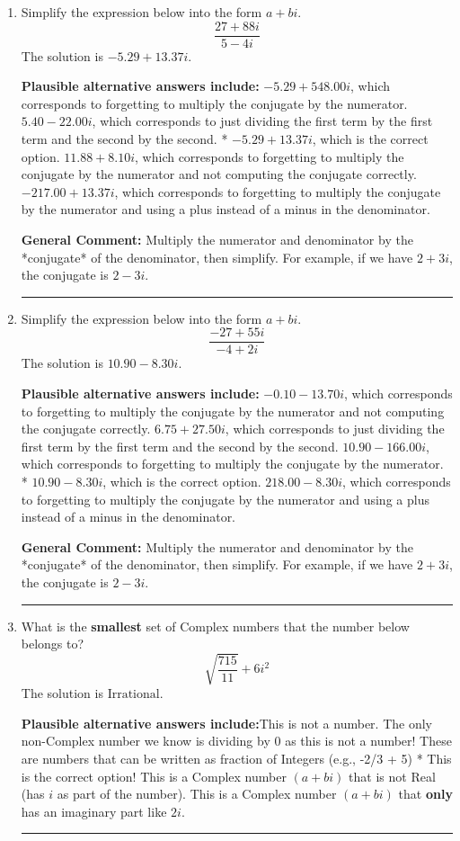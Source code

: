 \documentclass{extbook}[14pt]
\newcommand{\litem}[1]{\item #1

\rule{\textwidth}{0.4pt}}
\begin{document}
\begin{enumerate}\litem{
Simplify the expression below into the form $a+bi$.
\[ \frac{27 + 88 i}{5 - 4 i} \]The solution is \( -5.29  + 13.37 i \).\begin{enumerate}[label=\Alph*.]
\textbf{Plausible alternative answers include:} $-5.29  + 548.00 i$, which corresponds to forgetting to multiply the conjugate by the numerator.
 $5.40  - 22.00 i$, which corresponds to just dividing the first term by the first term and the second by the second.
* $-5.29  + 13.37 i$, which is the correct option.
 $11.88  + 8.10 i$, which corresponds to forgetting to multiply the conjugate by the numerator and not computing the conjugate correctly.
 $-217.00  + 13.37 i$, which corresponds to forgetting to multiply the conjugate by the numerator and using a plus instead of a minus in the denominator.
\end{enumerate}

\textbf{General Comment:} Multiply the numerator and denominator by the *conjugate* of the denominator, then simplify. For example, if we have $2+3i$, the conjugate is $2-3i$.
}
\litem{
Simplify the expression below into the form $a+bi$.
\[ \frac{-27 + 55 i}{-4 + 2 i} \]The solution is \( 10.90  - 8.30 i \).\begin{enumerate}[label=\Alph*.]
\textbf{Plausible alternative answers include:} $-0.10  - 13.70 i$, which corresponds to forgetting to multiply the conjugate by the numerator and not computing the conjugate correctly.
 $6.75  + 27.50 i$, which corresponds to just dividing the first term by the first term and the second by the second.
 $10.90  - 166.00 i$, which corresponds to forgetting to multiply the conjugate by the numerator.
* $10.90  - 8.30 i$, which is the correct option.
 $218.00  - 8.30 i$, which corresponds to forgetting to multiply the conjugate by the numerator and using a plus instead of a minus in the denominator.
\end{enumerate}

\textbf{General Comment:} Multiply the numerator and denominator by the *conjugate* of the denominator, then simplify. For example, if we have $2+3i$, the conjugate is $2-3i$.
}
\litem{
What is the \textbf{smallest} set of Complex numbers that the number below belongs to?
\[ \sqrt{\frac{715}{11}}+6i^2 \]The solution is \( \text{Irrational} \).\begin{enumerate}[label=\Alph*.]
\textbf{Plausible alternative answers include:}This is not a number. The only non-Complex number we know is dividing by 0 as this is not a number!
These are numbers that can be written as fraction of Integers (e.g., -2/3 + 5)
* This is the correct option!
This is a Complex number $(a+bi)$ that is not Real (has $i$ as part of the number).
This is a Complex number $(a+bi)$ that \textbf{only} has an imaginary part like $2i$.
\end{enumerate}

}
\end{enumerate}
\end{document}
